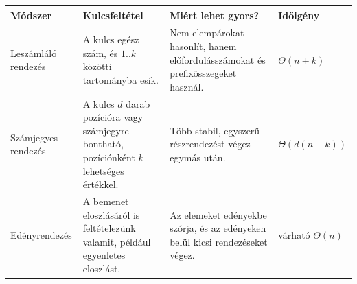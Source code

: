 \begingroup
\setlength{\tabcolsep}{4pt}
\begin{tabularx}{\textwidth}{L{0.22\textwidth}X X L{0.18\textwidth}}
\toprule
Módszer & Kulcsfeltétel & Miért lehet gyors? & Időigény \\
\midrule
Leszámláló rendezés & A kulcs egész szám, és $1..k$ közötti tartományba esik. & Nem elempárokat hasonlít, hanem előfordulásszámokat és prefixösszegeket használ. & $\Theta(n+k)$ \\
Számjegyes rendezés & A kulcs $d$ darab pozícióra vagy számjegyre bontható, pozíciónként $k$ lehetséges értékkel. & Több stabil, egyszerű részrendezést végez egymás után. & $\Theta(d(n+k))$ \\
Edényrendezés & A bemenet eloszlásáról is feltételezünk valamit, például egyenletes eloszlást. & Az elemeket edényekbe szórja, és az edényeken belül kicsi rendezéseket végez. & várható $\Theta(n)$ \\
\bottomrule
\end{tabularx}
\endgroup
